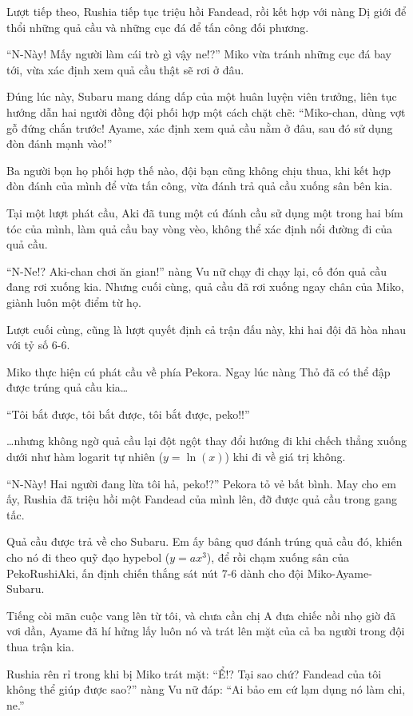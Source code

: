 \documentclass[../main.tex]{subfiles}
\begin{document}
Lượt tiếp theo, Rushia tiếp tục triệu hồi Fandead, rồi kết hợp với nàng Dị giới để thổi những quả cầu và những cục đá để tấn công đối phương.

``N-Này! Mấy người làm cái trò gì vậy ne!?'' Miko vừa tránh những cục đá bay tới, vừa xác định xem quả cầu thật sẽ rơi ở đâu.

Đúng lúc này, Subaru mang dáng dấp của một huân luyện viên trưởng, liên tục hướng dẫn hai người đồng đội phối hợp một cách chặt chẽ: ``Miko-chan, dùng vợt gỗ đứng chắn trước! Ayame, xác định xem quả cầu nằm ở đâu, sau đó sử dụng đòn đánh mạnh vào!''

Ba người bọn họ phối hợp thế nào, đội bạn cũng không chịu thua, khi kết hợp đòn đánh của mình để vừa tấn công, vừa đánh trả quả cầu xuống sân bên kia.

Tại một lượt phát cầu, Aki đã tung một cú đánh cầu sử dụng một trong hai bím tóc của mình, làm quả cầu bay vòng vèo, không thể xác định nổi đường đi của quả cầu.

``N-Ne!? Aki-chan chơi ăn gian!'' nàng Vu nữ chạy đi chạy lại, cố đón quả cầu đang rơi xuống kia. Nhưng cuối cùng, quả cầu đã rơi xuống ngay chân của Miko, giành luôn một điểm từ họ.

Lượt cuối cùng, cũng là lượt quyết định cả trận đấu này, khi hai đội đã hòa nhau với tỷ số 6-6.

Miko thực hiện cú phát cầu về phía Pekora. Ngay lúc nàng Thỏ đã có thể đập được trúng quả cầu kia\dots

``Tôi bắt được, tôi bắt được, tôi bắt được, peko!!''

\dots nhưng không ngờ quả cầu lại đột ngột thay đổi hướng đi khi chếch thẳng xuống dưới như hàm logarit tự nhiên (\(y = \ln(x)\)) khi đi về giá trị không.

``N-Này! Hai người đang lừa tôi hả, peko!?'' Pekora tỏ vẻ bất bình. May cho em ấy, Rushia đã triệu hồi một Fandead của mình lên, đỡ được quả cầu trong gang tấc.

Quả cầu được trả về cho Subaru. Em ấy bâng quơ đánh trúng quả cầu đó, khiến cho nó đi theo quỹ đạo hypebol (\(y = ax^3\)), để rồi chạm xuống sân của PekoRushiAki, ấn định chiến thắng sát nút 7-6 dành cho đội Miko-Ayame-Subaru.

Tiếng còi mãn cuộc vang lên từ tôi, và chưa cần chị A đưa chiếc nồi nhọ giờ đã vơi dần, Ayame đã hí hửng lấy luôn nó và trát lên mặt của cả ba người trong đội thua trận kia.

Rushia rên rỉ trong khi bị Miko trát mặt: ``Ể!? Tại sao chứ? Fandead của tôi không thể giúp được sao?'' nàng Vu nữ đáp: ``Ai bảo em cứ lạm dụng nó làm chi, ne.''
\end{document}
